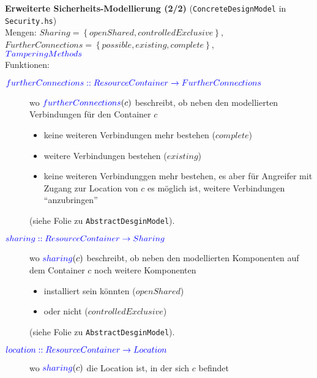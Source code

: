\documentclass[varwidth=18cm]{standalone}
\begin{document}
\textbf{Erweiterte Sicherheits-Modellierung (2/2)} (\texttt{ConcreteDesignModel} in \texttt{Security.hs})\\

Mengen: $Sharing = \left\{openShared, controlledExclusive\right\}$, \\
        $FurtherConnections = \left\{possible, existing, complete \right\}$, \\
        ${\color{blue}{TamperingMethods}}$ \\


Funktionen:
\begin{description}
  \item[${\color{blue}{furtherConnections :: ResourceContainer \rightarrow FurtherConnections}}$]
        wo ${\color{blue}{furtherConnections}}(c)$ beschreibt, ob neben den modellierten
        Verbindungen für den Container $c$ 
        \begin{itemize}
           \item keine weiteren Verbindungen mehr bestehen ($complete$)
           \item weitere Verbindungen bestehen ($existing$)
           \item keine weiteren Verbindunggen mehr bestehen, 
                 es aber für Angreifer mit Zugang zur Location von $c$ es möglich ist,
                 weitere Verbindungen \enquote{anzubringen}
        \end{itemize} (siehe Folie zu \texttt{AbstractDesginModel}).
  \item[${\color{blue}{sharing :: ResourceContainer \rightarrow Sharing}}$]
        wo ${\color{blue}{sharing}}(c)$ beschreibt, ob neben den modellierten
        Komponenten auf dem Container $c$ noch weitere Komponenten
        \begin{itemize}
           \item installiert sein könnten  ($openShared$)
           \item oder nicht ($controlledExclusive$)
        \end{itemize} (siehe Folie zu \texttt{AbstractDesginModel}).
  \item[${\color{blue}{location :: ResourceContainer \rightarrow Location}}$]
        wo ${\color{blue}{sharing}}(c)$ die Location ist, in der sich $c$ befindet
\end{description}
\end{document}
